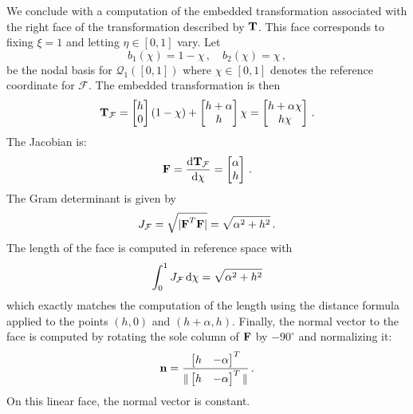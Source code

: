 \documentclass[../doc.tex]{subfiles}
\begin{document}
We conclude with a computation of the embedded transformation associated with the right face of the transformation described by $\boldsymbol{\mathrm{T}}$. This face corresponds to fixing $\xi = 1$ and letting $\eta \in [0,1]$ vary. Let 
	\begin{equation}
		b_1(\chi) = 1 - \chi \,, \quad b_2(\chi) = \chi \,,
	\end{equation}
be the nodal basis for $\mathcal{Q}_1([0,1])$ where $\chi \in [0,1]$ denotes the reference coordinate for $\mathcal{F}$. The embedded transformation is then
	\begin{equation}
		\boldsymbol{\mathrm{T}}_\mathcal{F} = \begin{bmatrix} 
			h \\ 0 
		\end{bmatrix}(1-\chi) + 
		\begin{bmatrix} 
			h+\alpha \\ h
		\end{bmatrix} \chi = \begin{bmatrix} 
			h + \alpha \chi \\ 
			h\chi 
		\end{bmatrix} \,. 
	\end{equation}
The Jacobian is: 
	\begin{equation}
		\boldsymbol{\mathrm{F}} = \frac{\mathop{}\!\mathrm{d} \boldsymbol{\mathrm{T}}_\mathcal{F}}{\mathop{}\!\mathrm{d} \chi} = \begin{bmatrix} 
			\alpha \\ h 
		\end{bmatrix} \,. 
	\end{equation}
The Gram determinant is given by 
	\begin{equation}
		J_\mathcal{F} = \sqrt{|\boldsymbol{\mathrm{F}}^T \boldsymbol{\mathrm{F}}|} = \sqrt{\alpha^2 + h^2} \,. 
	\end{equation}
The length of the face is computed in reference space with 
	\begin{equation}
		\int_0^1 J_\mathcal{F}\mathop{}\!\mathrm{d} \chi = \sqrt{\alpha^2 + h^2} 
	\end{equation}
which exactly matches the computation of the length using the distance formula applied to the points $(h,0)$ and $(h+\alpha,h)$. Finally, the normal vector to the face is computed by rotating the sole column of $\boldsymbol{\mathrm{F}}$ by $-90^\circ$ and normalizing it: 
	\begin{equation}
		\boldsymbol{\mathrm{n}} = \frac{\begin{bmatrix} h & -\alpha \end{bmatrix}^T}{\| \begin{bmatrix} h & -\alpha \end{bmatrix}^T\|} \,. 
	\end{equation}
On this linear face, the normal vector is constant. 
\end{document}

